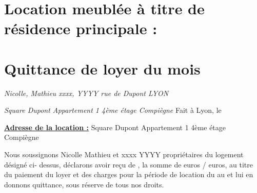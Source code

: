 \documentclass[a4paper,12pt]{article}
\begin{document}
\section*{\centering \Large Location meublée à titre de résidence principale :}
\section*{\centering \LARGE Quittance de loyer du mois  }


\begin{flushleft} 
\textit{\linebreak Nicolle, Mathieu \linebreak
xxxx, YYYY  rue de Dupont  LYON}
\end{flushleft}

\begin{flushright}
\textit{
  Square Dupont \linebreak
Appartement 1 4ème étage  Compiègne} \linebreak
\linebreak
Fait à Lyon, le 
\end{flushright}


\begin{flushleft} 
\underline{\textbf{Adresse de la location :}} Square Dupont \linebreak
Appartement 1 4ème étage  Compiègne
\end{flushleft}
    
Nous soussignons Nicolle Mathieu et xxxx YYYY propriétaires du logement désigné ci- dessus, déclarons avoir reçu de , la somme de  euros /  euros, au titre du paiement du loyer et des charges pour la période de location du  au  et lui en donnons quittance, sous réserve de tous nos droits.
\end{document}
